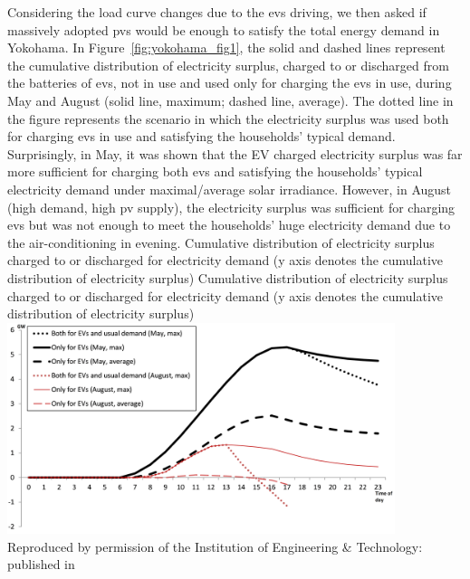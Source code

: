 Considering the load curve changes due to the \glspl{ev} driving, we then asked if massively adopted \glspl{pv} would be enough to satisfy the total energy demand in Yokohama. In Figure~\ref{fig:yokohama_fig1}, the solid and dashed lines represent the cumulative distribution of electricity surplus, charged to or discharged from the batteries of \glspl{ev}, not in use and used only for charging the \glspl{ev} in use, during May and August (solid line, maximum; dashed line, average). The dotted line in the figure represents the scenario in which the electricity surplus was used both for charging \glspl{ev} in use and satisfying the households' typical demand. Surprisingly, in May, it was shown that the EV charged electricity surplus was far more sufficient for charging both \glspl{ev} and satisfying the households' typical electricity demand under maximal/average solar irradiance. However, in August (high demand, high \gls{pv} supply), the electricity surplus was sufficient for charging \glspl{ev} but was not enough to meet the households' huge electricity demand due to the air-conditioning in evening. 
%
\createfigure%
{Cumulative distribution of electricity surplus charged to or discharged for electricity demand (y axis denotes the cumulative distribution of electricity surplus)}%
{Cumulative distribution of electricity surplus charged to or discharged for electricity demand (y axis denotes the cumulative distribution of electricity surplus)}%
{\label{fig:yokohama_fig1}}%
{\includegraphics[width=0.85\textwidth, angle=0]{./scenarios/figures/yokohama_fig1.png}}%
{Reproduced by permission of the Institution of Engineering \& Technology: published in \citet[][Figure~6]{YamagataSeya_ITSIET_2015}}

